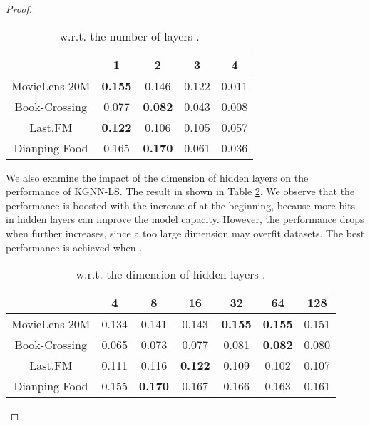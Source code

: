 \documentclass[sigconf]{acmart}
\begin{document}
\begin{proof}
			\begin{table}[t]
				\centering
				\setlength{\tabcolsep}{8pt}
				\begin{tabular}{c|cccc}
					\hline
					 & 1 & 2 & 3 & 4\\
					\hline
					MovieLens-20M & \textbf{0.155} & 0.146 & 0.122 & 0.011 \\
					Book-Crossing & 0.077 & \textbf{0.082} & 0.043 & 0.008 \\
					Last.FM & \textbf{0.122} & 0.106 & 0.105 & 0.057 \\
					Dianping-Food & 0.165 & \textbf{0.170} & 0.061 & 0.036 \\
					\hline
				\end{tabular}
				\vspace{0.05in}
				\caption{ w.r.t. the number of layers .}
				\label{table:L}
				\vspace{-0.2in}
			\end{table}
			
			We also examine the impact of the dimension of hidden layers  on the performance of KGNN-LS.
			The result in shown in Table \ref{table:d}.
			We observe that the performance is boosted with the increase of  at the beginning, because more bits in hidden layers can improve the model capacity.
			However, the performance drops when  further increases, since a too large dimension may overfit datasets.
			The best performance is achieved when .
			
			\begin{table}[t]
				\centering
				\setlength{\tabcolsep}{4pt}
				\begin{tabular}{c|cccccc}
					\hline
					 & 4 & 8 & 16 & 32 & 64 & 128\\
					\hline
					MovieLens-20M & 0.134 & 0.141 & 0.143 & \textbf{0.155} & \textbf{0.155} & 0.151 \\
					Book-Crossing & 0.065 & 0.073 & 0.077 & 0.081 & \textbf{0.082} & 0.080 \\
					Last.FM & 0.111 & 0.116 & \textbf{0.122} & 0.109 & 0.102 & 0.107 \\
					Dianping-Food & 0.155 & \textbf{0.170} & 0.167 & 0.166 & 0.163 & 0.161 \\
					\hline
				\end{tabular}
				\vspace{0.05in}
				\caption{ w.r.t. the dimension of hidden layers .}
				\label{table:d}
				\vspace{-0.2in}
			\end{table}


\end{proof}
\end{document}
